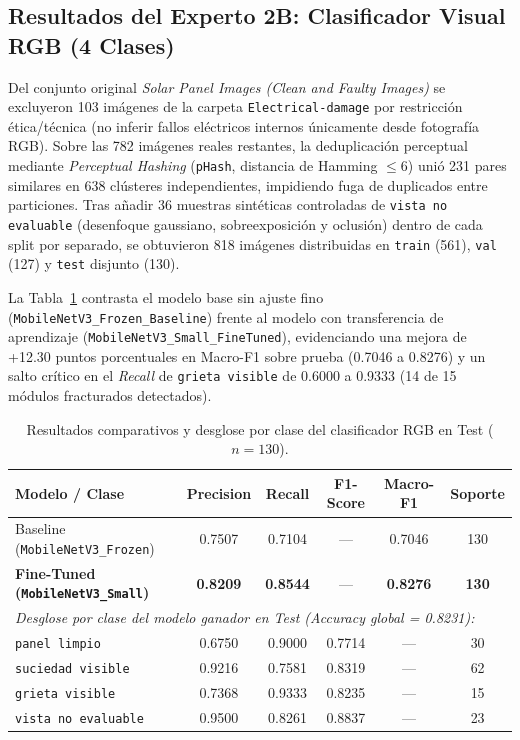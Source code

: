 \documentclass[12pt,a4paper]{article}
\begin{document}
\subsection{Resultados del Experto 2B: Clasificador Visual RGB (4 Clases)}
\label{sec:res_rgb}
Del conjunto original \textit{Solar Panel Images (Clean and Faulty Images)} se excluyeron 103 imágenes de la carpeta \texttt{Electrical-damage} por restricción ética/técnica (no inferir fallos eléctricos internos únicamente desde fotografía RGB). Sobre las 782 imágenes reales restantes, la deduplicación perceptual mediante \textit{Perceptual Hashing} (\texttt{pHash}, distancia de Hamming $\leq 6$) unió 231 pares similares en 638 clústeres independientes, impidiendo fuga de duplicados entre particiones. Tras añadir 36 muestras sintéticas controladas de \texttt{vista no evaluable} (desenfoque gaussiano, sobreexposición y oclusión) dentro de cada split por separado, se obtuvieron 818 imágenes distribuidas en \texttt{train} (561), \texttt{val} (127) y \texttt{test} disjunto (130).

La Tabla~\ref{tab:res_rgb} contrasta el modelo base sin ajuste fino (\texttt{MobileNetV3\_Frozen\_Baseline}) frente al modelo con transferencia de aprendizaje (\texttt{MobileNetV3\_Small\_FineTuned}), evidenciando una mejora de +12.30 puntos porcentuales en Macro-F1 sobre prueba (0.7046 a 0.8276) y un salto crítico en el \textit{Recall} de \texttt{grieta visible} de 0.6000 a 0.9333 (14 de 15 módulos fracturados detectados).

\begin{table}[H]
\centering
\caption{Resultados comparativos y desglose por clase del clasificador RGB en Test ($n=130$).}
\label{tab:res_rgb}
\small
\begin{tabular}{lccccc}
\toprule
\textbf{Modelo / Clase} & \textbf{Precision} & \textbf{Recall} & \textbf{F1-Score} & \textbf{Macro-F1} & \textbf{Soporte} \\
\midrule
Baseline (\texttt{MobileNetV3\_Frozen}) & 0.7507 & 0.7104 & --- & 0.7046 & 130 \\
\textbf{Fine-Tuned (\texttt{MobileNetV3\_Small})} & \textbf{0.8209} & \textbf{0.8544} & --- & \textbf{0.8276} & \textbf{130} \\
\midrule
\multicolumn{6}{l}{\textit{Desglose por clase del modelo ganador en Test (Accuracy global = 0.8231):}} \\
\texttt{panel limpio}       & 0.6750 & 0.9000 & 0.7714 & --- & 30 \\
\texttt{suciedad visible}   & 0.9216 & 0.7581 & 0.8319 & --- & 62 \\
\texttt{grieta visible}     & 0.7368 & 0.9333 & 0.8235 & --- & 15 \\
\texttt{vista no evaluable} & 0.9500 & 0.8261 & 0.8837 & --- & 23 \\
\bottomrule
\end{tabular}
\end{table}
\end{document}
